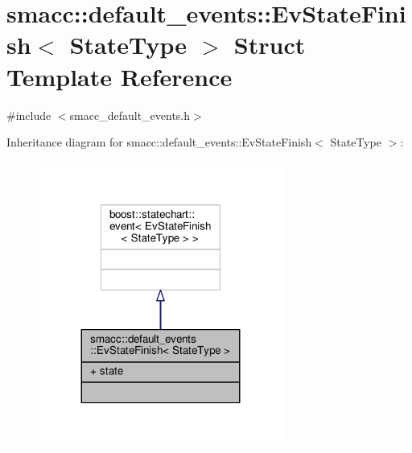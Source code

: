 \hypertarget{structsmacc_1_1default__events_1_1EvStateFinish}{}\section{smacc\+:\+:default\+\_\+events\+:\+:Ev\+State\+Finish$<$ State\+Type $>$ Struct Template Reference}
\label{structsmacc_1_1default__events_1_1EvStateFinish}


{\ttfamily \#include $<$smacc\+\_\+default\+\_\+events.\+h$>$}



Inheritance diagram for smacc\+:\+:default\+\_\+events\+:\+:Ev\+State\+Finish$<$ State\+Type $>$\+:\nopagebreak
\begin{figure}[H]
\begin{center}
\leavevmode
\includegraphics[width=227pt]{structsmacc_1_1default__events_1_1EvStateFinish__inherit__graph}
\end{center}
\end{figure}


